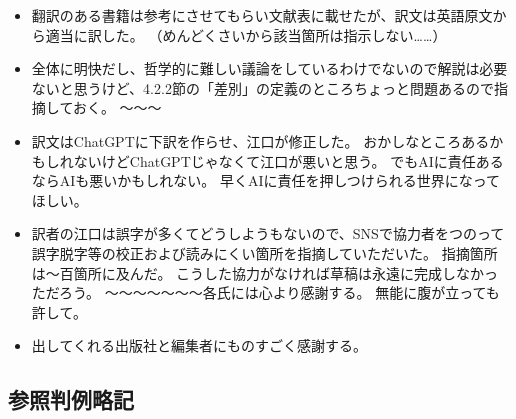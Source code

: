 \documentclass[paper=a4,book,openany]{jlreq}
\begin{document}
\begin{itemize}
\item 翻訳のある書籍は参考にさせてもらい文献表に載せたが、訳文は英語原文から適当に訳した。
（めんどくさいから該当箇所は指示しない……）

\item 全体に明快だし、哲学的に難しい議論をしているわけでないので解説は必要ないと思うけど、4.2.2節の「差別」の定義のところちょっと問題あるので指摘しておく。
〜〜〜

\item 訳文はChatGPTに下訳を作らせ、江口が修正した。
おかしなところあるかもしれないけどChatGPTじゃなくて江口が悪いと思う。
でもAIに責任あるならAIも悪いかもしれない。
早くAIに責任を押しつけられる世界になってほしい。
\item 訳者の江口は誤字が多くてどうしようもないので、SNSで協力者をつのって誤字脱字等の校正および読みにくい箇所を指摘していただいた。
指摘箇所は〜百箇所に及んだ。
こうした協力がなければ草稿は永遠に完成しなかっただろう。
〜〜〜〜〜〜〜各氏には心より感謝する。
無能に腹が立っても許して。
\item 出してくれる出版社と編集者にものすごく感謝する。
\end{itemize}
\fi

{\footnotesize
{}
{}

  
}

\subsection*{参照判例略記}
\end{document}

